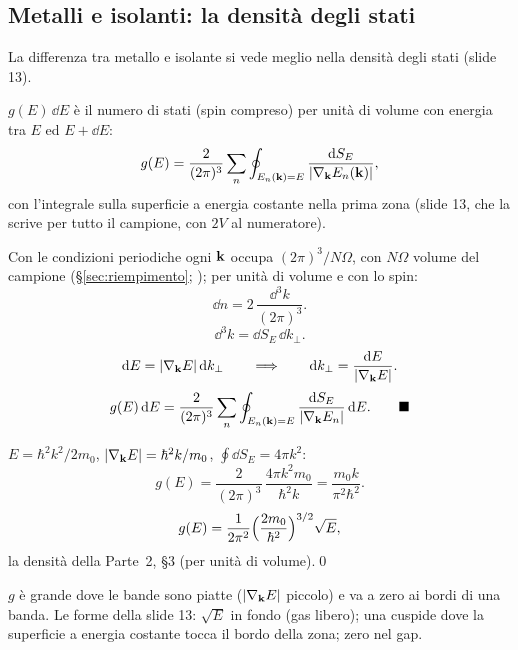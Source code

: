 \documentclass[11pt,a4paper]{article}
\begin{document}
\subsection{Metalli e isolanti: la densità degli stati}\label{sec:dos}
La differenza tra metallo e isolante si vede meglio nella densità degli stati (slide 13).

\begin{definizione}
$g(E)\,\dd E$ è il numero di stati (spin compreso) per unità di volume con energia tra $E$ ed $E+\dd E$:
\[
g(E)=\frac2{(2\pi)^3}\sum_n\oint_{E_n(\mathbf k)=E}\frac{\mathrm d S_E}{|\nabla_{\mathbf k}E_n(\mathbf k)|},
\]
con l'integrale sulla superficie a energia costante nella prima zona (slide 13, che la scrive per tutto il campione, con $2V$ al numeratore).
\end{definizione}

\begin{dimostrazione}
Con le condizioni periodiche ogni $\mathbf k$ occupa $(2\pi)^3/N\Omega$, con $N\Omega$ volume del campione (§\ref{sec:riempimento}; ); per unità di volume e con
lo spin:
\[
\dd n=2\,\frac{\dd^3k}{(2\pi)^3}.
\]
\[
\dd^3k=\dd S_E\,\dd k_\perp .
\]
\[
\mathrm d E=|\nabla_{\mathbf k}E|\,\mathrm d k_\perp\qquad\Longrightarrow\qquad\mathrm d k_\perp=\frac{\mathrm d E}{|\nabla_{\mathbf k}E|}.
\]
\[
g(E)\,\dd E=\frac2{(2\pi)^3}\sum_n\oint_{E_n(\vk)=E}\frac{\dd S_E}{|\nabla_{\vk}E_n|}\,\dd E .\qed
\]
\end{dimostrazione}

\begin{dimostrazione}
$E=\hbar^2k^2/2m_0$, $|\nabla_{\mathbf k}E|=\hbar^2k/m_0$, $\oint\dd S_E=4\pi k^2$:
\[
g(E)=\frac2{(2\pi)^3}\,\frac{4\pi k^2m_0}{\hbar^2k}=\frac{m_0k}{\pi^2\hbar^2}.
\]
\[
g(E)=\frac1{2\pi^2}\Bigl(\frac{2m_0}{\hbar^2}\Bigr)^{3/2}\sqrt E,
\]
la densità della Parte~2, §3 (per unità di volume).\qed
\end{dimostrazione}

\begin{interpretazione}
$g$ è grande dove le bande sono piatte ($|\nabla_{\mathbf k}E|$ piccolo) e va a zero ai bordi di una banda. Le forme della slide 13: $\sqrt E$ in fondo
(gas libero); una cuspide dove la superficie a energia costante tocca il bordo della zona; zero nel gap.
\end{interpretazione}
\end{document}
